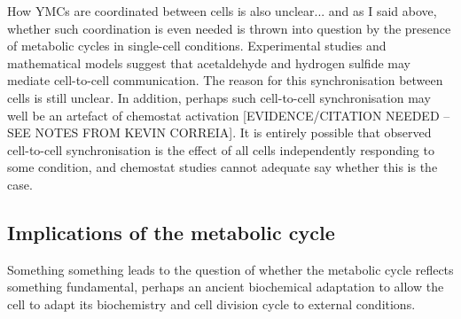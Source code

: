 How YMCs are coordinated between cells is also unclear... and as I said above, whether such coordination is even needed is thrown into question by the presence of metabolic cycles in single-cell conditions.
Experimental studies \citep{murrayRegulationYeastOscillatory2007} and mathematical models
\citep{krishnaMinimalPushPull2018} suggest that acetaldehyde and hydrogen sulfide may mediate cell-to-cell communication.
The reason for this synchronisation between cells is still unclear. %
In addition, perhaps such cell-to-cell synchronisation may well be an artefact of chemostat activation [EVIDENCE/CITATION NEEDED -- SEE NOTES FROM KEVIN CORREIA].
It is entirely possible that observed cell-to-cell synchronisation is the effect of all cells independently responding to some condition, and chemostat studies cannot adequate say whether this is the case.

\subsection{Implications of the metabolic cycle}
\label{subsec:intro-ymc-implications}



Something something leads to the question of whether the metabolic cycle reflects something fundamental, perhaps an ancient biochemical adaptation to allow the cell to adapt its biochemistry and cell division cycle to external conditions.


